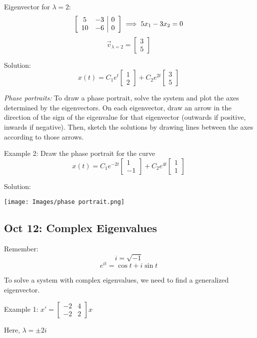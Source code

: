 \documentclass[12pt]{article}
\begin{document}
Eigenvector for $\lambda = 2$:
\[\left[\begin{array}{c c | c}
    5 & -3 & 0\\
    10 & -6 & 0
\end{array}\right] \implies 5x_1 - 3x_2 = 0\]
\[\vec{v}_{\lambda = 2} = \begin{bmatrix}
    3\\
    5
\end{bmatrix}\]

Solution:
\[\boxed{x(t) = C_1 e^{t} \begin{bmatrix}
    1\\2
\end{bmatrix} + C_2 e^{2t} \begin{bmatrix}
    3\\5
\end{bmatrix}}\]

\emph{Phase portraits:}
To draw a phase portrait, solve the system and plot the axes determined by the eigenvectors. On each eigenvector, draw an arrow in the direction of the sign of the eigenvalue for that eigenvector (outwards if positive, inwards if negative). Then, sketch the solutions by drawing lines between the axes according to those arrows.

Example 2: Draw the phase portrait for the curve 
\[x(t) = C_1 e^{-2t} \begin{bmatrix}
    1\\-1
\end{bmatrix}+ C_2 e^{4t} \begin{bmatrix}
    1\\1
\end{bmatrix}\]

Solution:

\texttt{[image: Images/phase portrait.png]}

\subsection*{Oct 12: Complex Eigenvalues}
Remember:
\[i = \sqrt{-1}\]
\[e^{it} = \cos t + i \sin t\]

To solve a system with complex eigenvalues, we need to find a generalized eigenvector. 

Example 1: $x' = \begin{bmatrix}
    -2 & 4\\
    -2 & 2
\end{bmatrix} x$

Here, $\lambda = \pm 2i$
\end{document}
